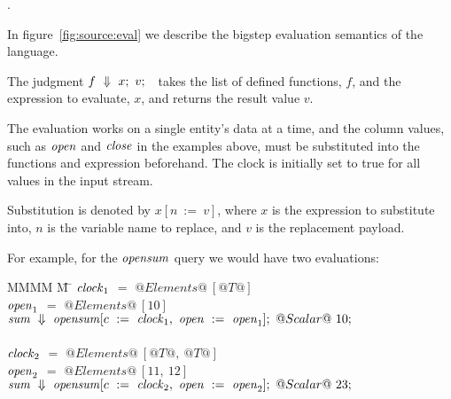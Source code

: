 
.

In figure~\ref{fig:source:eval} we describe the bigstep evaluation semantics of the language.

The judgment $\Bigstep{f}{x}{v}$ takes the list of defined functions, $f$, and the expression to evaluate, $x$, and returns the result value $v$.


The evaluation works on a single entity's data at a time, and the column values, such as $\mathit{open}$ and $\mathit{close}$ in the examples above, must be substituted into the functions and expression beforehand. 
The clock is initially set to true for all values in the input stream.

Substitution is denoted by $x[n~:=~v]$, where $x$ is the expression to substitute into, $n$ is the variable name to replace, and $v$ is the replacement payload.

For example, for the $\mathit{opensum}$ query we would have two evaluations:
\begin{tabbing}
MMMM \= M \= \kill
$\mathit{clock}_1$ \> $=$ \> $@Elements@~[@T@]$ \\
$\mathit{open}_1$  \> $=$ \> $@Elements@~[10]$ \\
$\Bigstep{\mi{sum}}{\mi{opensum}[c~:=~\mi{clock}_1,~\mi{open}~:=~\mi{open}_1]}{@Scalar@~10} $ \\
\\
$\mathit{clock}_2$ \> $=$ \> $@Elements@~[@T@,~@T@]$ \\
$\mathit{open}_2$  \> $=$ \> $@Elements@~[11,~12]$ \\
$\Bigstep{\mi{sum}}{\mi{opensum}[c~:=~\mi{clock}_2,~\mi{open}~:=~\mi{open}_2]}{@Scalar@~23} $
\end{tabbing}

 

